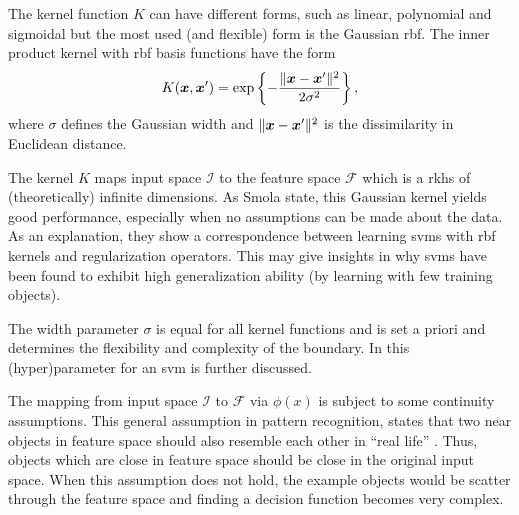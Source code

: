 The kernel function $K$ can have different forms, such as linear, polynomial and sigmoidal but the most used (and flexible) form is the Gaussian \gls{rbf}.
The inner product kernel with \gls{rbf} basis functions have the form
\begin{equation}
  K(\vectorsym{x}, \vectorsym{x}') = \operatorname*{exp} \left\{ - \frac{\rVert \vectorsym{x} - \vectorsym{x}' \rVert ^2}{2 \sigma^2} \right\},
\end{equation}
where $\sigma$ defines the Gaussian width and $\rVert \vectorsym{x} - \vectorsym{x}' \rVert ^2$ is the dissimilarity in Euclidean distance.

The kernel $K$ maps input space $\mathcal{I}$ to the feature space $\mathcal{F}$ which is a \gls{rkhs} of (theoretically) infinite dimensions.
As Smola \etal \cite{smola1998connection} state, this Gaussian kernel yields good performance, especially when no assumptions can be made about the data.
As an explanation, they show a correspondence between learning \glspl{svm} with \gls{rbf} kernels and regularization operators.
This may give insights in why \glspl{svm} have been found to exhibit high generalization ability (by learning with few training objects).

The width parameter $\sigma$ is equal for all kernel functions and is set a priori and determines the flexibility and complexity of the boundary.
In  this (hyper)parameter for an \gls{svm} is further discussed.

The mapping from input space $\mathcal{I}$ to $\mathcal{F}$ via $\phi(x)$ is subject to some continuity assumptions.
This general assumption in pattern recognition, states that two near objects in feature space should also resemble each other in ``real life'' \cite{tax2001one}.
Thus, objects which are close in feature space should be close in the original input space.
When this assumption does not hold, the example objects would be scatter through the feature space and finding a decision function becomes very complex.

